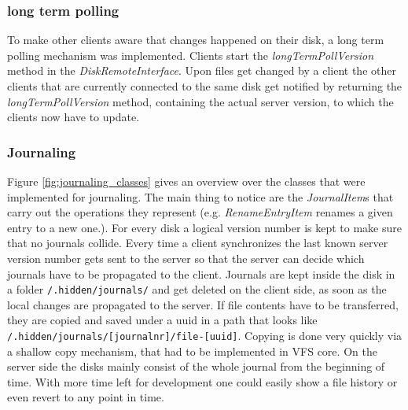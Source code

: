 \subsubsection{long term polling}
To make other clients aware that changes happened on their disk, a long term
polling mechanism was implemented. Clients start the
\textit{longTermPollVersion} method in the \textit{DiskRemoteInterface}. Upon
files get changed by a client the other clients that are currently connected to
the same disk get notified by returning the \textit{longTermPollVersion} method,
containing the actual server version, to which the clients now have to update.

\subsubsection{Journaling}
Figure \ref{fig:journaling_classes} gives an overview over the classes that
were implemented for journaling. The main thing to notice are the
\textit{JournalItem}s that carry out the operations they represent (e.g.
\textit{RenameEntryItem} renames a given entry to a new one.). For every disk a
logical version number is kept to make sure that no journals collide. Every time
a client synchronizes the last known server version number gets sent to the
server so that the server can decide which journals have to be propagated to the
client. Journals are kept inside the disk in a folder \verb|/.hidden/journals/|
and get deleted on the client side, as soon as the local changes are propagated
to the server. If file contents have to be transferred, they are copied and
saved under a uuid in a path that looks like \verb|/.hidden/journals/[journalnr]/file-[uuid]|.
Copying is done very quickly via a shallow copy mechanism, that had to be
implemented in VFS core. On the server side the disks mainly consist of the
whole journal from the beginning of time. With more time left for development
one could easily show a file history or even revert to any point in time.


